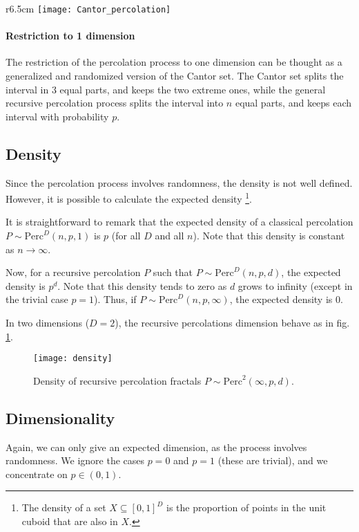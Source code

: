\begin{wrapfigure}{r}{6.5cm}
	\vspace{-0.5cm}
	\centering
	\texttt{[image: Cantor\_percolation]}
	\caption{1D Recursive Percolation\\($n=3, d=4, p=0.6$)}
	\label{fig:CantorPercolation}
	\vspace{-1cm}
\end{wrapfigure}
\paragraph{Restriction to 1 dimension}
The restriction of the percolation process to one dimension can be thought as a generalized and randomized version of the Cantor set.
The Cantor set splits the interval in 3 equal parts, and keeps the two extreme ones, while the general recursive percolation process splits the interval into $n$ equal parts, and keeps each interval with probability $p$.

\subsection{Density}\label{density}
Since the percolation process involves randomness, the density is not well defined.
However, it is possible to calculate the expected density
\footnote{The density of a set $X \subseteq \left[ 0,1 \right]^D$ is the proportion of points in the unit cuboid that are also in $X$.}.

It is straightforward to remark that the expected density of a classical percolation $P \sim \text{Perc}^D(n,p,1)$ is $p$ (for all $D$ and all $n$).
Note that this density is constant as $n \to \infty$.

Now, for a recursive percolation $P$ such that $P \sim \text{Perc}^D(n,p,d)$, the expected density is $p^d$.
Note that this density tends to zero as $d$ grows to infinity (except in the trivial case $p=1$).
Thus, if $P \sim \text{Perc}^D(n,p,\infty)$, the expected density is $0$.

In two dimensions ($D = 2$), the recursive percolations dimension behave as in fig. \ref{fig:density}.
\begin{figure}[!h]
	\centering
	\texttt{[image: density]}
	\caption{Density of recursive percolation fractals $P \sim \text{Perc}^2(\infty,p,d)$.}
	\label{fig:density}
\end{figure}

\subsection{Dimensionality}
Again, we can only give an expected dimension, as the process involves randomness.
We ignore the cases $p=0$ and $p=1$ (these are trivial), and we concentrate on $p \in (0,1)$.

